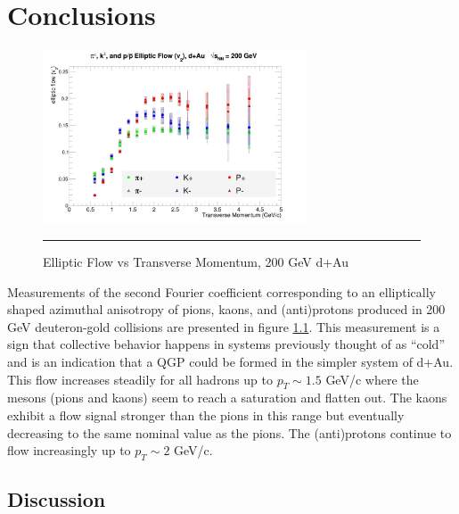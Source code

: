 
\chapter{Conclusions} %

\begin{figure}[hbtp]

\centering
    \includegraphics[width=0.7\textwidth]{results/v2all.jpg}
    \rule{35em}{0.5pt}
    \caption[Elliptic Flow vs Transverse Momentum, 200 GeV d+Au]{Elliptic Flow vs Transverse Momentum, 200 GeV d+Au}
    \label{fig:v2main}
\end{figure}

Measurements of the second Fourier coefficient corresponding to an elliptically shaped azimuthal anisotropy of pions, kaons, and (anti)protons produced in 200 GeV deuteron-gold collisions are presented in figure \ref{fig:v2main}. This measurement is a sign that collective behavior happens in systems previously thought of as ``cold'' and is an indication that a QGP could be formed in the simpler system of d+Au. This flow increases steadily for all hadrons up to $p_T \sim 1.5 $ GeV/c where the mesons (pions and kaons) seem to reach a saturation and flatten out. The kaons exhibit a flow signal stronger than the pions in this range but eventually decreasing to the same nominal value as the pions. The (anti)protons continue to flow increasingly up to $p_T \sim 2$ GeV/c. 

\section{Discussion}


